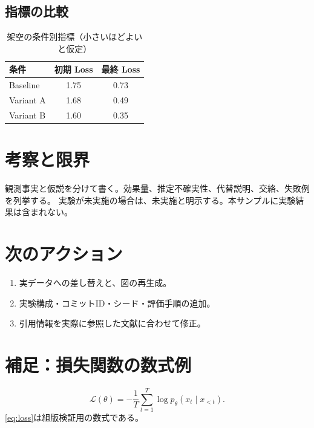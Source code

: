 \documentclass[11pt,a4paper]{ltjsarticle}
\begin{document}
\subsection{指標の比較}
\begin{table}[htbp]
\centering
\caption{架空の条件別指標（小さいほどよいと仮定）}\label{tab:metrics}
\begin{tabular}{lSS}
\toprule
{条件} & {初期 Loss} & {最終 Loss}\\
\midrule
Baseline & 1.75 & 0.73\\
Variant A & 1.68 & 0.49\\
Variant B & 1.60 & 0.35\\
\bottomrule
\end{tabular}
\end{table}
\section{考察と限界}
観測事実と仮説を分けて書く。効果量、推定不確実性、代替説明、交絡、失敗例を列挙する。
実験が未実施の場合は、未実施と明示する。本サンプルに実験結果は含まれない。
\section{次のアクション}
\begin{enumerate}
\item 実データへの差し替えと、図の再生成。
\item 実験構成・コミットID・シード・評価手順の追加。
\item 引用情報を実際に参照した文献に合わせて修正。
\end{enumerate}
\printbibliography[title={参考文献}]
\appendix
\section{補足：損失関数の数式例}
\begin{equation}\label{eq:loss}
\mathcal{L}(\theta)=-\frac{1}{T}\sum_{t=1}^{T}\log p_\theta(x_t\mid x_{<t}).
\end{equation}
\cref{eq:loss}は組版検証用の数式である。
\end{document}
